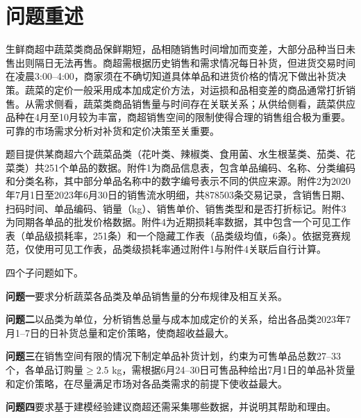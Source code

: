 
\section{问题重述}

生鲜商超中蔬菜类商品保鲜期短，品相随销售时间增加而变差，大部分品种当日未售出则隔日无法再售。商超需根据历史销售和需求情况每日补货，但进货交易时间在凌晨3:00--4:00，商家须在不确切知道具体单品和进货价格的情况下做出补货决策。蔬菜的定价一般采用成本加成定价方法，对运损和品相变差的商品通常打折销售。从需求侧看，蔬菜类商品销售量与时间存在关联关系；从供给侧看，蔬菜供应品种在4月至10月较为丰富，商超销售空间的限制使得合理的销售组合极为重要。可靠的市场需求分析对补货和定价决策至关重要。

题目提供某商超六个蔬菜品类（花叶类、辣椒类、食用菌、水生根茎类、茄类、花菜类）共251个单品的数据。附件1为商品信息表，包含单品编码、名称、分类编码和分类名称，其中部分单品名称中的数字编号表示不同的供应来源。附件2为2020年7月1日至2023年6月30日的销售流水明细，共878503条交易记录，含销售日期、扫码时间、单品编码、销量（kg）、销售单价、销售类型和是否打折标记。附件3为同期各单品的批发价格数据。附件4为近期损耗率数据，其中包含一个可见工作表（单品级损耗率，251条）和一个隐藏工作表（品类级均值，6条）。依据竞赛规范\cite{CUMCM2023}，仅使用可见工作表，品类级损耗率通过附件1与附件4关联后自行计算。

四个子问题如下。

\textbf{问题一}要求分析蔬菜各品类及单品销售量的分布规律及相互关系。

\textbf{问题二}以品类为单位，分析销售总量与成本加成定价的关系，给出各品类2023年7月1--7日的日补货总量和定价策略，使商超收益最大。

\textbf{问题三}在销售空间有限的情况下制定单品补货计划，约束为可售单品总数27--33个，各单品订购量$\geq 2.5$ kg，需根据6月24--30日可售品种给出7月1日的单品补货量和定价策略，在尽量满足市场对各品类需求的前提下使收益最大。

\textbf{问题四}要求基于建模经验建议商超还需采集哪些数据，并说明其帮助和理由。
